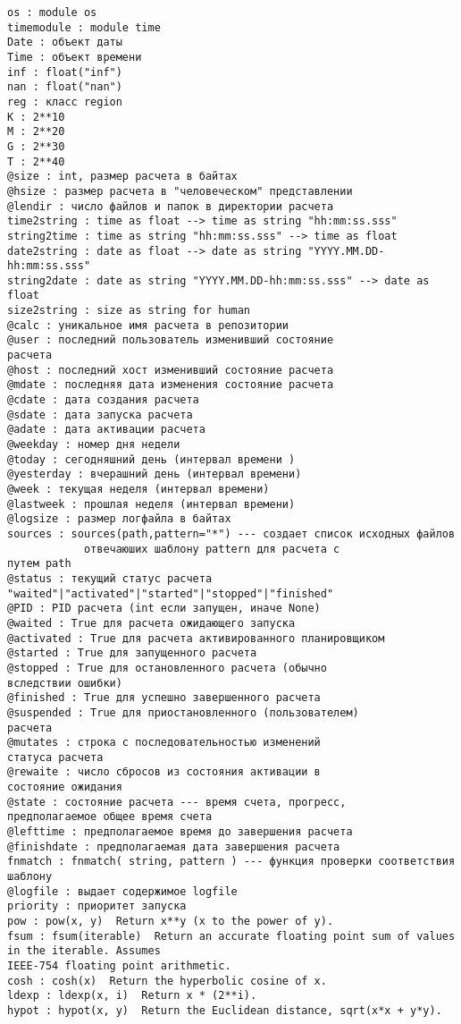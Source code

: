 \begin{verbatim}
os : module os
timemodule : module time
Date : объект даты
Time : объект времени
inf : float("inf")
nan : float("nan")
reg : класс region
K : 2**10
M : 2**20
G : 2**30
T : 2**40
@size : int, размер расчета в байтах
@hsize : размер расчета в "человеческом" представлении
@lendir : число файлов и папок в директории расчета
time2string : time as float --> time as string "hh:mm:ss.sss"
string2time : time as string "hh:mm:ss.sss" --> time as float
date2string : date as float --> date as string "YYYY.MM.DD-hh:mm:ss.sss"
string2date : date as string "YYYY.MM.DD-hh:mm:ss.sss" --> date as float
size2string : size as string for human
@calc : уникальное имя расчета в репозитории
@user : последний пользователь изменивший состояние 
расчета
@host : последний хост изменивший состояние расчета
@mdate : последняя дата изменения состояние расчета
@cdate : дата создания расчета
@sdate : дата запуска расчета
@adate : дата активации расчета
@weekday : номер дня недели
@today : сегодняшний день (интервал времени )
@yesterday : вчерашний день (интервал времени)
@week : текущая неделя (интервал времени)
@lastweek : прошлая неделя (интервал времени)
@logsize : размер логфайла в байтах
sources : sources(path,pattern="*") --- создает список исходных файлов
			отвечаюших шаблону pattern для расчета c 
путем path
@status : текущий статус расчета 
"waited"|"activated"|"started"|"stopped"|"finished"
@PID : PID расчета (int если запущен, иначе None)
@waited : True для расчета ожидающего запуска
@activated : True для расчета активированного планировщиком
@started : True для запущенного расчета
@stopped : True для остановленного расчета (обычно 
вследствии ошибки)
@finished : True для успешно завершенного расчета
@suspended : True для приостановленного (пользователем) 
расчета
@mutates : строка с последовательностью изменений 
статуса расчета
@rewaite : число сбросов из состояния активации в 
состояние ожидания
@state : состояние расчета --- время счета, прогресс, 
предполагаемое общее время счета
@lefttime : предполагаемое время до завершения расчета
@finishdate : предполагаемая дата завершения расчета
fnmatch : fnmatch( string, pattern ) --- функция проверки соответствия 
шаблону
@logfile : выдает содержимое logfile
priority : приоритет запуска
pow : pow(x, y)  Return x**y (x to the power of y).
fsum : fsum(iterable)  Return an accurate floating point sum of values in the iterable. Assumes 
IEEE-754 floating point arithmetic.
cosh : cosh(x)  Return the hyperbolic cosine of x.
ldexp : ldexp(x, i)  Return x * (2**i).
hypot : hypot(x, y)  Return the Euclidean distance, sqrt(x*x + y*y).

\end{verbatim}

